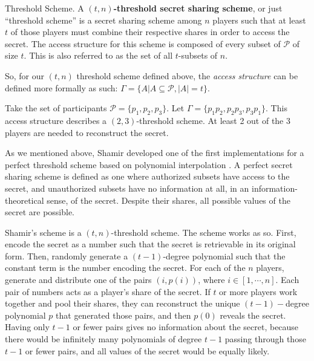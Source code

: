 \begin{definition}{Threshold Scheme.}
    \label{defn:threshold-scheme}
    A \textbf{$(t,n)$-threshold secret sharing scheme}, or just ``threshold scheme'' is a secret sharing scheme among $n$ players such that at least $t$ of those players must combine their respective shares in order to access the secret. The access structure for this scheme is composed of every subset of $\mathcal{P}$ of size $t$. This is also referred to as the set of all $t$-subsets of $n$.
\end{definition}

So, for our $(t,n)$ threshold scheme defined above, the \textit{access structure} can be defined more formally as such: $\Gamma = \{A | A \subseteq \mathcal{P} , |A| = t\}$.

\begin{example}
    Take the set of participants $\mathcal{P} = \{p_1,p_2,p_3\}$. Let $\Gamma = \{p_1p_2,p_2p_3,p_3p_1\}$. This access structure describes a $(2,3)$-threshold scheme. At least 2 out of the 3 players are needed to reconstruct the secret.
\end{example}

As we mentioned above, Shamir developed one of the first implementations for a perfect threshold scheme based on polynomial interpolation \cite{shamir_how_1979}. A perfect secret sharing scheme is defined as one where authorized subsets have access to the secret, and unauthorized subsets have no information at all, in an information-theoretical sense, of the secret. Despite their shares, all possible values of the secret are possible.

Shamir's scheme is a $(t,n)$-threshold scheme. The scheme works as so. First, encode the secret as a number such that the secret is retrievable in its original form. Then, randomly generate a $(t-1)$-degree polynomial such that the constant term is the number encoding the secret. For each of the $n$ players, generate and distribute one of the pairs $(i, p(i))$, where $i \in [1, \cdots, n]$. Each pair of numbers acts as a player's share of the secret. If $t$ or more players work together and pool their shares, they can reconstruct the unique $(t-1)-$degree polynomial $p$ that generated those pairs, and then $p(0)$ reveals the secret. Having only $t-1$ or fewer pairs gives no information about the secret, because there would be infinitely many polynomials of degree $t-1$ passing through those $t-1$ or fewer pairs, and all values of the secret would be equally likely.

